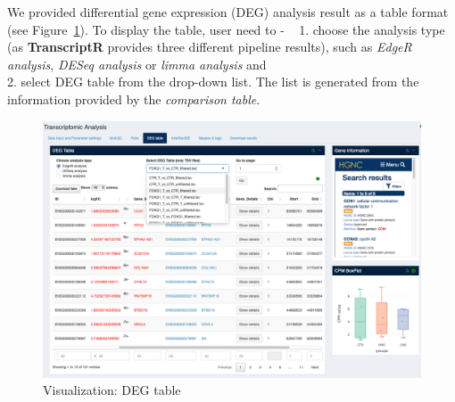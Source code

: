 \documentclass[
  a4paper,
  oneside,
  open=any]{scrreport}
\begin{document}
We provided differential gene expression (DEG) analysis result as a
table format (see Figure~\ref{fig-trans8}). To display the table, user
need to - ~ 1. choose the analysis type (as \textbf{TranscriptR}
provides three different pipeline results), such as \emph{EdgeR
analysis}, \emph{DESeq analysis} or \emph{limma analysis} and\\
2. select DEG table from the drop-down list. The list is generated from
the information provided by the \emph{comparison table}.

\begin{figure}[H]

{\centering \includegraphics{./images/transcriptome/transcript9.png}

}

\caption{\label{fig-trans8}Visualization: DEG table}

\end{figure}
\end{document}
